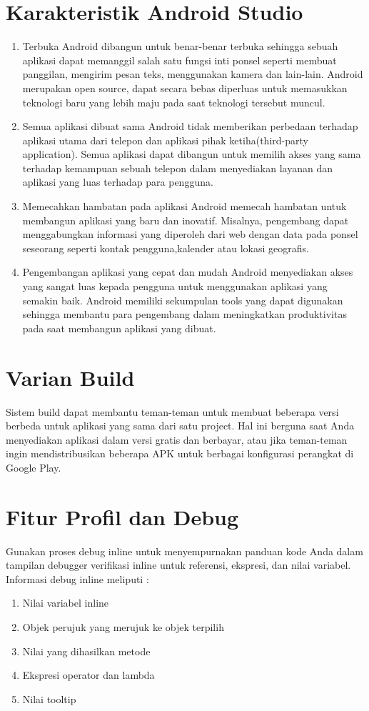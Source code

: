 \begin{enumerate}
\section{Karakteristik Android Studio}
\begin{enumerate}
\item Terbuka
\hfill \break
Android dibangun untuk benar-benar terbuka sehingga sebuah aplikasi dapat memanggil salah satu fungsi inti ponsel seperti membuat panggilan, mengirim pesan teks, menggunakan kamera dan lain-lain. Android merupakan open source, dapat secara bebas diperluas untuk memasukkan teknologi baru yang lebih maju pada saat teknologi tersebut muncul.
\item Semua aplikasi dibuat sama
\hfill \break
Android tidak memberikan perbedaan terhadap aplikasi utama dari telepon dan aplikasi pihak ketiha(third-party application). Semua aplikasi dapat dibangun untuk memilih akses yang sama terhadap kemampuan sebuah telepon dalam menyediakan layanan dan aplikasi yang luas terhadap para pengguna.
\item Memecahkan hambatan pada aplikasi
\hfill \break
Android memecah hambatan untuk membangun aplikasi yang baru dan inovatif. Misalnya, pengembang dapat menggabungkan informasi yang diperoleh dari web dengan data pada ponsel seseorang seperti kontak pengguna,kalender atau lokasi geografis.
\item Pengembangan aplikasi yang cepat dan mudah
\hfill \break
Android menyediakan akses yang sangat luas kepada pengguna untuk menggunakan aplikasi yang semakin baik. Android memiliki sekumpulan tools yang dapat digunakan sehingga membantu para pengembang dalam meningkatkan produktivitas pada saat membangun aplikasi yang dibuat.
\end{enumerate}
\section{Varian Build}
\hfill \break
Sistem build dapat membantu teman-teman untuk membuat beberapa versi berbeda untuk aplikasi yang sama dari satu project. Hal ini berguna saat Anda menyediakan aplikasi dalam versi gratis dan berbayar, atau jika teman-teman ingin mendistribusikan beberapa APK untuk berbagai konfigurasi perangkat di Google Play.
\section{Fitur Profil dan Debug}
\hfill \break
Gunakan proses debug inline untuk menyempurnakan panduan kode Anda dalam tampilan debugger verifikasi inline untuk referensi, ekspresi, dan nilai variabel. Informasi debug inline meliputi :
\begin{enumerate}
\item Nilai variabel inline
\item Objek perujuk yang merujuk ke objek terpilih
\item Nilai yang dihasilkan metode
\item Ekspresi operator dan lambda
\item Nilai tooltip
\end{enumerate}

\end{enumerate}
